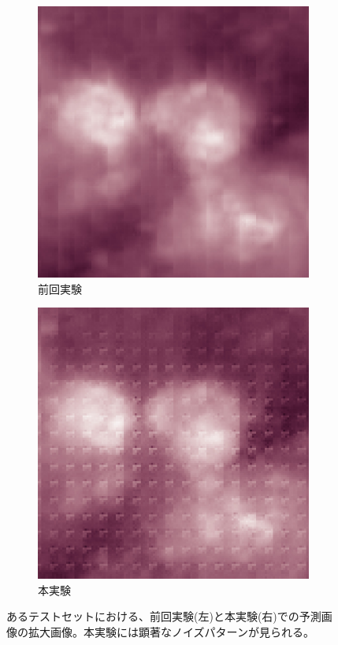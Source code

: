     \begin{figure}[htbp]
      \begin{subfigure}{0.5\textwidth}
        \centering
        \includegraphics[width=\textwidth]{figures/exp2/sample_exp1.jpg}
        \caption{前回実験}
      \end{subfigure}
      \begin{subfigure}{0.5\textwidth}
        \centering
        \includegraphics[width=\textwidth]{figures/exp2/sample_exp2.jpg}
        \caption{本実験}
      \end{subfigure}
      \caption{あるテストセットにおける、前回実験(左)と本実験(右)での予測画像の拡大画像。本実験には顕著なノイズパターンが見られる。}
      \label{fig:exp2_pd_discuss_1}
    \end{figure}
